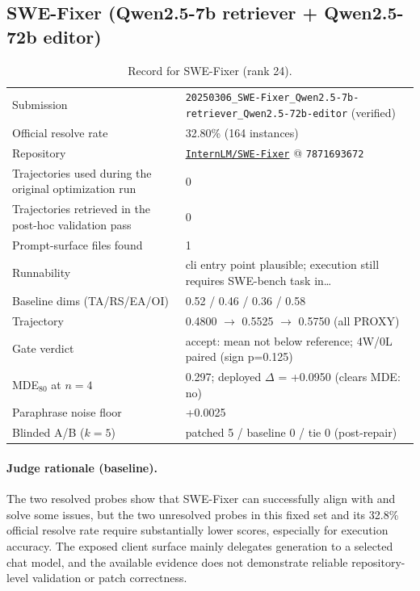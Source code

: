 \subsection{SWE-Fixer (Qwen2.5-7b retriever + Qwen2.5-72b editor)}
\label{app:agent24}
\begin{table}[h]\centering\scriptsize
\caption{Record for SWE-Fixer (rank 24).}
\begin{tabular}{lp{8.2cm}}\toprule
Submission & \texttt{20250306\_\allowbreak{}SWE-Fixer\_\allowbreak{}Qwen2.5-7b-retriever\_\allowbreak{}Qwen2.5-72b-editor} (verified) \\
Official resolve rate & 32.80\% (164 instances) \\
Repository & \href{https://github.com/InternLM/SWE-Fixer}{\texttt{InternLM/SWE-Fixer}} @ \texttt{7871693672} \\
Trajectories used during the original optimization run & 0 \\
Trajectories retrieved in the post-hoc validation pass & 0 \\
Prompt-surface files found & 1 \\
Runnability & cli entry point plausible; execution still requires SWE-bench task in\ldots{} \\
Baseline dims (TA/RS/EA/OI) & 0.52 / 0.46 / 0.36 / 0.58 \\
Trajectory & 0.4800 $\to$ 0.5525 $\to$ 0.5750 (all PROXY) \\
Gate verdict & accept: mean not below reference; 4W/0L paired (sign p=0.125) \\
MDE$_{80}$ at $n{=}4$ & 0.297; deployed $\Delta$ = +0.0950 (clears MDE: no) \\
Paraphrase noise floor & +0.0025 \\
Blinded A/B ($k{=}5$) & patched 5 / baseline 0 / tie 0 (post-repair) \\
\bottomrule\end{tabular}\end{table}
\paragraph{Judge rationale (baseline).}
The two resolved probes show that SWE-Fixer can successfully align with and solve some issues, but the two unresolved probes in this fixed set and its 32.8\% official resolve rate require substantially lower scores, especially for execution accuracy. The exposed client surface mainly delegates generation to a selected chat model, and the available evidence does not demonstrate reliable repository-level validation or patch correctness.
